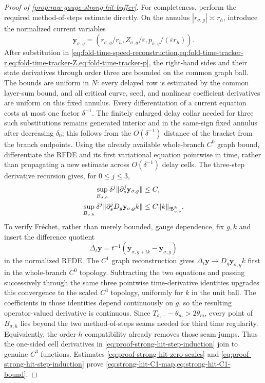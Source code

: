 \begin{proof}[Proof of
\cref{prop:raw-gauge-strong-hit-buffer}]
For completeness, perform the required method-of-steps estimate directly.
On the annulus
\(|r_{\sigma,g}|\asymp r_h\), introduce the normalized current variables
\begin{equation*}
 \mathbf y_{\sigma,g}
 =\left(r_{\sigma,g}/r_h,
        Z_{\sigma,g}/\varepsilon,
        p_{\sigma,g}/(\varepsilon r_h)\right).
\end{equation*}
After substitution in
\cref{eq:fold-time-speed-reconstruction,eq:fold-time-tracker-r,eq:fold-time-tracker-Z,eq:fold-time-tracker-p},
the right-hand sides and their state derivatives through order three are
bounded on the common graph ball.  The bounds are uniform in \(N\): every
delayed row is estimated by the common layer-sum bound, and all critical
curve, seed, and nonlinear coefficient derivatives are uniform on this
fixed annulus.  Every differentiation of a current equation costs at most
one factor \(\delta^{-1}\).  The finitely enlarged delay collar needed for
three such substitutions remains generated interior and in the same-sign
fixed annulus after decreasing \(\delta_0\); this follows from the
\(O(\delta^{-1})\) distance of the bracket from the branch endpoints.
Using the already available whole-branch \(C^0\) graph bound, differentiate
the RFDE and its first variational equation pointwise in time, rather than
propagating a new estimate across \(O(\delta^{-1})\) delay cells.  The
three-step derivative recursion gives, for \(0\le j\le3\),
\begin{align}
 \sup_{B_{\sigma,h}}\delta^j
       \|\partial_s^j\mathbf y_{\sigma,g}\|&\le C,\notag\\
 \sup_{B_{\sigma,h}}\delta^j
       \|\partial_s^jD_g\mathbf y_{\sigma,g}k\|
 &\le C\|k\|_{\mathfrak B_{\sigma,\delta}^h}.  \label{eq:proof-strong-hit-step-induction}
\end{align}
To verify Fr\'{e}chet, rather than merely bounded, gauge dependence, fix
\(g,k\) and insert the difference quotient
\[
 \Delta_t\mathbf y
 =t^{-1}(\mathbf y_{\sigma,g+tk}-\mathbf y_{\sigma,g})
\]
in the normalized RFDE.  The \(C^1\) graph reconstruction gives
\(\Delta_t\mathbf y\to D_g\mathbf y_{\sigma,g}k\) first in the whole-branch
\(C^0\) topology.  Subtracting the two equations and passing successively
through the same three pointwise time-derivative identities upgrades this
convergence to the scaled \(C^3\) topology, uniformly for \(k\) in the unit
ball.  The coefficients in those identities depend continuously on
\(g\), so the resulting operator-valued derivative is continuous.  Since
\(T_{\sigma,-}-\theta_m>2\theta_m\), every point of
\(B_{\sigma,h}\) lies beyond the two method-of-steps seams needed for
third time regularity.  Equivalently, the order-\(h\) compatibility already
removes those seam jumps.  Thus the one-sided cell derivatives in
\cref{eq:proof-strong-hit-step-induction} join to genuine \(C^3\)
functions.  Estimates
\eqref{eq:proof-strong-hit-zero-scales} and
\eqref{eq:proof-strong-hit-step-induction}
prove \cref{eq:strong-hit-C1-map,eq:strong-hit-C1-bound}.


\end{proof}
